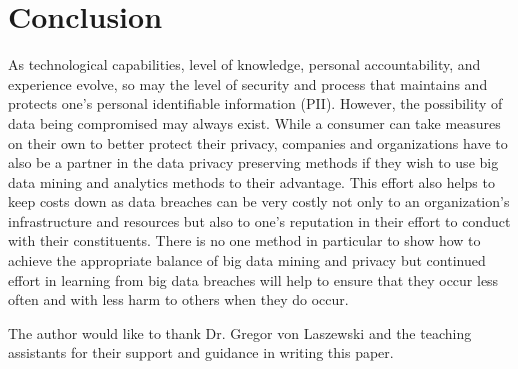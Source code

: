 \documentclass[sigconf]{acmart}
\begin{document}
\section{Conclusion}
As technological capabilities, level of knowledge, personal accountability, and experience evolve, so may the level of security and process that maintains and protects one's personal identifiable information (PII). However, the possibility of data being compromised may always exist. While a consumer can take measures on their own to better protect their privacy, companies and organizations have to also be a partner in the data privacy preserving methods if they wish to use big data mining and analytics methods to their advantage. This effort also helps to keep costs down as data breaches can be very costly not only to an organization's infrastructure and resources but also to one's reputation in their effort to conduct  with their constituents. There is no one method in particular to show how to achieve the appropriate balance of big data mining and privacy but continued effort in learning from big data breaches will help to ensure that they occur less often and with less harm to others when they do occur. 


\begin{acks}

  The author would like to thank Dr. Gregor von Laszewski and the teaching assistants for their support and guidance in writing this paper.

\end{acks}


 
\end{document}
